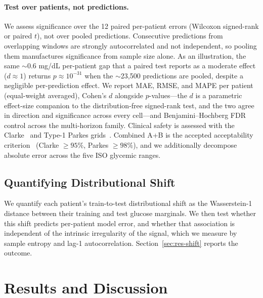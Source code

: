 \documentclass[conference]{IEEEtran}
\begin{document}
\paragraph{Test over patients, not predictions.}
We assess significance over the 12 paired per-patient errors (Wilcoxon signed-rank
or paired $t$), not over pooled predictions. Consecutive predictions from
overlapping windows are strongly autocorrelated and not independent, so pooling
them manufactures significance from sample size alone. As an illustration, the same
$\sim$0.6 mg/dL per-patient gap that a paired test reports as a moderate effect
($d\approx1$) returns $p\approx10^{-31}$ when the $\sim$23{,}500 predictions are
pooled, despite a negligible per-prediction effect. We report MAE, RMSE, and MAPE
per patient (equal-weight averaged), Cohen's $d$ alongside $p$-values---the $d$ is a
parametric effect-size companion to the distribution-free signed-rank test, and the
two agree in direction and significance across every cell---and Benjamini--Hochberg
FDR control across the multi-horizon family. Clinical safety is
assessed with the Clarke~\cite{Clarke1987ClinicalAccuracy} and Type-1 Parkes
grids~\cite{Parkes2000Consensus,Pfutzner2013Parkes}. Combined A+B is the accepted
acceptability criterion~\cite{KOST200831} (Clarke $\ge95\%$, Parkes $\ge98\%$), and
we additionally decompose absolute error across the five ISO glycemic ranges.

\subsection{Quantifying Distributional Shift}
\label{sec:shift}
We quantify each patient's train-to-test distributional shift as the Wasserstein-1
distance between their training and test glucose marginals. We then test whether
this shift predicts per-patient model error, and whether that association is
independent of the intrinsic irregularity of the signal, which we measure by sample
entropy and lag-1 autocorrelation. Section~\ref{sec:res-shift} reports the outcome.

\section{Results and Discussion}
\label{sec:results}
\end{document}

